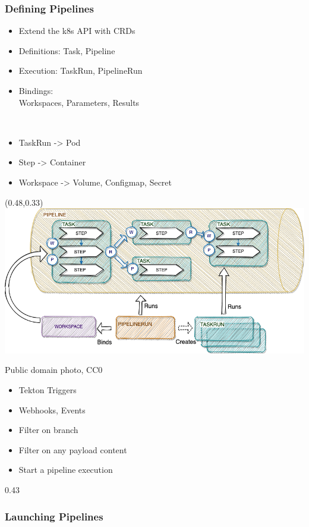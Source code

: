 \documentclass[aspectratio=169,11pt,hyperref={colorlinks=true}]{beamer}
\begin{document}
\begin{lgrayrwhiteframe}
  \frametitle{Defining Pipelines}
  \begin{itemize}
    \item Extend the k8s API with CRDs
    \item Definitions: Task, Pipeline
    \item Execution: TaskRun, PipelineRun
    \item Bindings: \\Workspaces, Parameters, Results
  \end{itemize}
  ~
  \begin{itemize}
    \item TaskRun -> Pod
    \item Step -> Container
    \item Workspace -> Volume, Configmap, Secret
  \end{itemize}
  \begin{textblock*}{0.51\paperwidth}(0.48\paperwidth,0.33\paperheight)
    \includegraphics[width=0.5\paperwidth]{img/tekton-workspaces.png}
  \end{textblock*}
\end{lgrayrwhiteframe}

\begin{lgrayframerpic}{Public domain photo, CC0}%
  {%
  \begin{itemize}
    \item Tekton Triggers
    \item Webhooks, Events
    \item Filter on branch
    \item Filter on any payload content
    \item Start a pipeline execution
  \end{itemize}
  }%
  {0.43}
  \frametitle{Launching Pipelines}
\end{lgrayframerpic}
\end{document}
